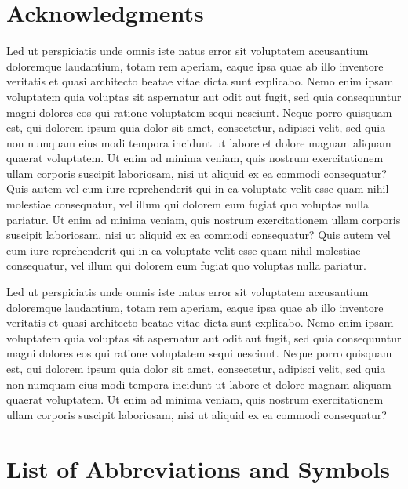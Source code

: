 \documentclass[11pt,a4paper]{report}
\numberwithin{equation}{section}
\begin{document}
    \chapter*{Acknowledgments}
    Led ut perspiciatis unde omnis iste natus error sit voluptatem accusantium doloremque laudantium, totam rem aperiam, eaque ipsa quae ab illo inventore veritatis et quasi architecto beatae vitae dicta sunt explicabo. Nemo enim ipsam voluptatem quia voluptas sit aspernatur aut odit aut fugit, sed quia consequuntur magni dolores eos qui ratione voluptatem sequi nesciunt. Neque porro quisquam est, qui dolorem ipsum quia dolor sit amet, consectetur, adipisci velit, sed quia non numquam eius modi tempora incidunt ut labore et dolore magnam aliquam quaerat voluptatem. Ut enim ad minima veniam, quis nostrum exercitationem ullam corporis suscipit laboriosam, nisi ut aliquid ex ea commodi consequatur? Quis autem vel eum iure reprehenderit qui in ea voluptate velit esse quam nihil molestiae consequatur, vel illum qui dolorem eum fugiat quo voluptas nulla pariatur. Ut enim ad minima veniam, quis nostrum exercitationem ullam corporis suscipit laboriosam, nisi ut aliquid ex ea commodi consequatur? Quis autem vel eum iure reprehenderit qui in ea voluptate velit esse quam nihil molestiae consequatur, vel illum qui dolorem eum fugiat quo voluptas nulla pariatur.

    \par
    Led ut perspiciatis unde omnis iste natus error sit voluptatem accusantium doloremque laudantium, totam rem aperiam, eaque ipsa quae ab illo inventore veritatis et quasi architecto beatae vitae dicta sunt explicabo. Nemo enim ipsam voluptatem quia voluptas sit aspernatur aut odit aut fugit, sed quia consequuntur magni dolores eos qui ratione voluptatem sequi nesciunt. Neque porro quisquam est, qui dolorem ipsum quia dolor sit amet, consectetur, adipisci velit, sed quia non numquam eius modi tempora incidunt ut labore et dolore magnam aliquam quaerat voluptatem. Ut enim ad minima veniam, quis nostrum exercitationem ullam corporis suscipit laboriosam, nisi ut aliquid ex ea commodi consequatur?

    \newpage
    \tableofcontents

    \listoffigures
    \listoftables

    \newpage
    \chapter*{List of Abbreviations and Symbols}
\end{document}
